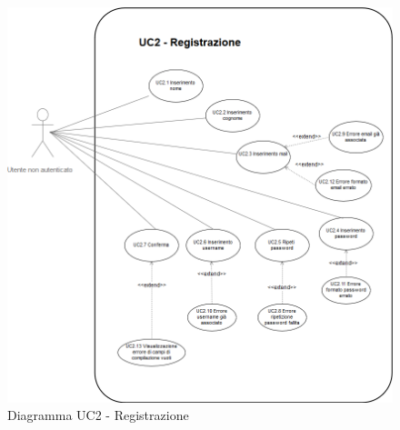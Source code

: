         \begin{figure}[h!]
           \begin{center}
           \includegraphics[scale=0.50]{immagini/2.png}
           \caption{Diagramma UC2 - Registrazione}
           \end{center}
        \end{figure}

 
 
        
